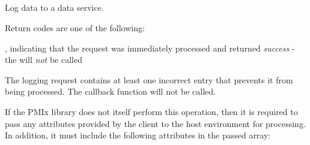 \subsection{}

\summary

Log data to a data service.

\format


\begin{arglist}
\end{arglist}

Return codes are one of the following:

\returnsimplenb

\returnstart
\begin{constantdesc}
\item {}, indicating that the request was immediately processed and returned \textit{success} - the  will \textit{not} be called
\item {} The logging request contains at least one incorrect entry that prevents it from being processed. The callback function will not be called.
\end{constantdesc}
\returnend

\reqattrstart
If the \ac{PMIx} library does not itself perform this operation, then it is required to pass any attributes provided by the client to the host environment for processing. In addition, it must include the following attributes in the passed  array:


